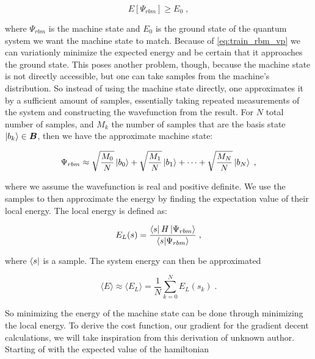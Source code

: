 \begin{equation}
  E \left [ \Psi_{rbm} \right ] \geq E_0 \; ,
  \label{eq:train_rbm_vp}
\end{equation}

where $\Psi_{rbm}$ is the machine state and $E_0$ is the ground state of the quantum system we want the machine state to match. Because of \ref{eq:train_rbm_vp} we can variationly minimize the expected energy and be certain that it approaches the ground state. This poses another problem, though, because the machine state is not directly accessible, but one can take samples from the machine's distribution. So instead of using the machine state directly, one approximates it by a sufficient amount of samples, essentially taking repeated measurements of the system and constructing the wavefunction from the result. For $N$ total number of samples, and $M_k$ the number of samples that are the basis state $\ket{b_k} \in \boldsymbol{B}$, then we have the approximate machine state:

\begin{equation}
  \Psi_{rbm} \approx \sqrt{\frac{M_0}{N}} \ket{b_0} + \sqrt{\frac{M_1}{N}}\ket{b_1} + \dots + \sqrt{\frac{M_N}{N}}\ket{b_N} \; ,
  \label{eq:approximate_machine_state}
\end{equation}

where we assume the wavefunction is real and positive definite. We use the samples to then approximate the energy by finding the expectation value of their local energy. The local energy is defined as:

\begin{equation}
  E_L(s) = \frac{\bra{s}H\ket{\Psi_{rbm}}}{\braket{s}{\Psi_{rbm}}} \; ,
  \label{eq:rbm_local_energy}
\end{equation}

where $\bra{s}$ is a sample. The system energy can then be approximated

\begin{equation}
  \langle E \rangle \approx \langle E_L \rangle = \frac{1}{N} \sum_{k=0}^{N} E_L(s_k) \; .
  \label{eq:rbm_energy}
\end{equation}

So minimizing the energy of the machine state can be done through minimizing the local energy. To derive the cost function, our gradient for the gradient decent calculations, we will take inspiration from this derivation \cite{DerivationGradient} of unknown author. Starting of with the expected value of the hamiltonian

